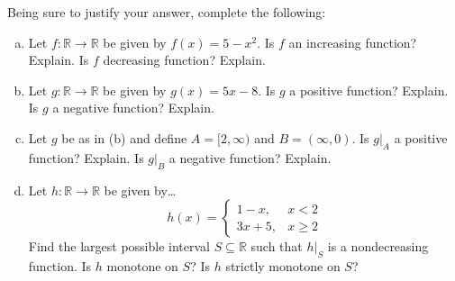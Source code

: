 \documentclass[11pt,letterpaper]{article}
\begin{document}
\newpage



 Being sure to justify your answer, complete the following:
	\begin{enumerate}[(a)]
	\item Let $f: \mathbb{R} \to \mathbb{R}$ be given by $f(x)= 5 - x^2$. Is $f$ an increasing function? Explain. Is $f$ decreasing function? Explain. 
	\item Let $g: \mathbb{R} \to \mathbb{R}$ be given by $g(x)= 5x - 8$. Is $g$ a positive function? Explain. Is $g$ a negative function? Explain. 
	\item Let $g$ be as in (b) and define $A= [2, \infty)$ and $B= (\infty, 0)$. Is $g \big|_A$ a positive function? Explain. Is $g \big|_B$ a negative function? Explain. 
	\item Let $h: \mathbb{R} \to \mathbb{R}$ be given by\dots
		\[
		h(x)= 
		\begin{cases}
		1 - x, & x < 2 \\
		3x + 5, & x \geq 2
		\end{cases}
		\]
	Find the largest possible interval $S \subseteq \mathbb{R}$ such that $h \big|_S$ is a nondecreasing function. Is $h$ monotone on $S$? Is $h$ strictly monotone on $S$?
	\end{enumerate}
\end{document}
